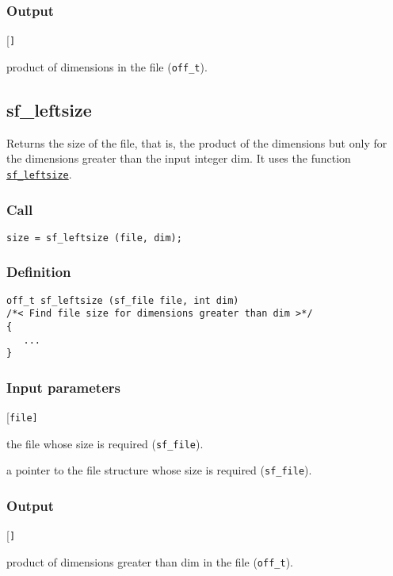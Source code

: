 \subsubsection*{Output}
\begin{desclist}{\tt }{\quad}[\tt ]
   \setlength\itemsep{0pt}
   \item[size] product of dimensions in the file (\texttt{off\_t}).
\end{desclist}




\subsection{{sf\_leftsize}}\label{sec:sf_leftsize}
Returns the size of the file, that is, the product of the dimensions but only for the dimensions greater than the input integer dim. It uses the function \hyperref[sec:sf_leftsize]{\texttt{sf\_leftsize}}.

\subsubsection*{Call}
\begin{verbatim}size = sf_leftsize (file, dim);\end{verbatim}

\subsubsection*{Definition}
\begin{verbatim}
off_t sf_leftsize (sf_file file, int dim) 
/*< Find file size for dimensions greater than dim >*/
{
   ...
}
\end{verbatim}

\subsubsection*{Input parameters}
\begin{desclist}{\tt }{\quad}[\tt file]
   \setlength\itemsep{0pt}
   \item[file] the file whose size is required (\texttt{sf\_file}). 
   \item[dim] a pointer to the file structure whose size is required (\texttt{sf\_file}).  
\end{desclist}

\subsubsection*{Output}
\begin{desclist}{\tt }{\quad}[\tt ]
   \setlength\itemsep{0pt}
   \item[size] product of dimensions greater than dim in the file (\texttt{off\_t}).
\end{desclist}




